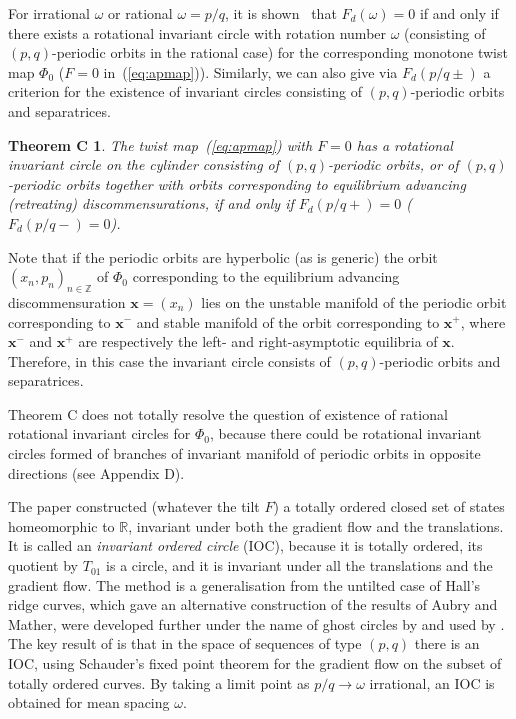 \documentclass[12pt]{article}
\newcommand{\R}{\mathbb{R}}
\newcommand{\Z}{\mathbb{Z}}
\newcounter{number}
\newtheorem*{thmC}{Theorem C}
\newcommand{\refer}[1]{~(\ref{#1})}
\newcommand{\xbf}{{\mathbf{x}}}
\begin{document}
\vspace{2mm}

For irrational $\omega$ or rational $\omega=p/q$, it is shown~\cite{QW1} that $F_d(\omega)=0$ if and only if there exists a rotational invariant circle with rotation number $\omega$ (consisting of $(p,q)$-periodic orbits in the rational case) for the corresponding monotone twist map $\Phi_0$ ($F=0$ in\refer{eq:apmap}). Similarly, we can also give via $F_d(p/q\pm)$ a criterion for the existence of invariant circles consisting of $(p,q)$-periodic orbits and separatrices.

\begin{thmC}\label{thmC}
The twist map\refer{eq:apmap} with $F=0$ has a rotational invariant circle on the cylinder consisting of $(p,q)$-periodic orbits, or of $(p,q)$-periodic orbits together with orbits corresponding to equilibrium advancing (retreating) discommensurations, if and only if $F_d(p/q+)=0$ ($F_d(p/q-)=0$).
\end{thmC}

Note that if the periodic orbits are hyperbolic (as is generic) the orbit $(x_n,p_n)_{n\in\Z}$ of $\Phi_0$ corresponding to the equilibrium advancing discommensuration $\xbf=(x_n)$ lies on the unstable manifold of the periodic orbit corresponding to $\xbf^-$ and stable manifold of the  orbit corresponding to $\xbf^+$, where $\xbf^-$ and $\xbf^+$ are respectively the left- and right-asymptotic equilibria of  $\xbf$. Therefore, in this case the invariant circle consists of $(p,q)$-periodic orbits and separatrices.


Theorem C does not totally resolve the question of existence of rational rotational invariant circles for $\Phi_0$, because there could be rotational invariant circles formed of branches of invariant manifold of periodic orbits in opposite directions (see  Appendix D).

The paper \cite{QW1} constructed (whatever the tilt $F$) a totally ordered closed set of states homeomorphic to $\R$, invariant under both the gradient flow and the translations.  It is called an {\em invariant ordered circle} (IOC), because it is totally ordered, its quotient by $T_{01}$ is a circle, and it is invariant under all the translations and the gradient flow.  The method is a generalisation from the untilted case of Hall's ridge curves, which gave an alternative construction of the results of Aubry and Mather, were developed further under the name of ghost circles by \cite{Go} and used by \cite{LC}.  The key result of \cite{QW1} is that in the space of sequences of type $(p,q)$ there is an IOC, using Schauder's fixed point theorem for the gradient flow on the subset of totally ordered curves.  By taking a limit point as $p/q \to \omega$ irrational, an IOC is obtained for mean spacing $\omega$.
\end{document}
